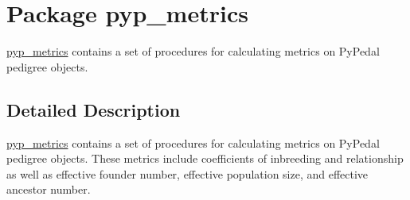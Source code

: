 \hypertarget{namespacepyp__metrics}{
\section{Package pyp\_\-metrics}
\label{namespacepyp__metrics}
}


\hyperlink{namespacepyp__metrics}{pyp\_\-metrics} contains a set of procedures for calculating metrics on PyPedal pedigree objects.  




\subsection{Detailed Description}
\hyperlink{namespacepyp__metrics}{pyp\_\-metrics} contains a set of procedures for calculating metrics on PyPedal pedigree objects. These metrics include coefficients of inbreeding and relationship as well as effective founder number, effective population size, and effective ancestor number. 